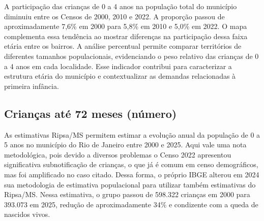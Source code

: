 
A participação das crianças de 0 a 4 anos na população total do município diminuiu entre os Censos de 2000, 2010 e 2022. A proporção passou de aproximadamente 7,6\% em 2000 para 5,8\% em 2010 e 5,0\% em 2022. O mapa complementa essa tendência ao mostrar diferenças na participação dessa faixa etária entre os bairros. A análise percentual permite comparar territórios de diferentes tamanhos populacionais, evidenciando o peso relativo das crianças de 0 a 4 anos em cada localidade. Esse indicador contribui para caracterizar a estrutura etária do município e contextualizar as demandas relacionadas à primeira infância.


\subsection{Crianças até 72 meses (número)}


As estimativas Ripsa/MS permitem estimar a evolução anual da população de 0 a 5 anos no município do Rio de Janeiro entre 2000 e 2025. Aqui vale uma nota metodológica, pois devido a diversos problemas o Censo 2022 apresentou significativa subnotificação de crianças, o que já é comum em censo demográficos, mas foi amplificado no caso citado. Dessa forma, o próprio IBGE alterou em 2024 sua metodologia de estimativa populacional para utilizar também estimativas do Ripsa/MS. Nessa estimativa, o grupo passou de 598.322 crianças em 2000 para 393.073 em 2025, redução de aproximadamente 34\% e condizente com a queda de nascidos vivos.


